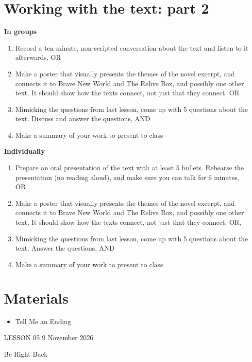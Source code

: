 \documentclass[11pt,a4paper,oneside]{book}
\newcommand{\tasktitle}[1]{{\color{blue}\bfseries #1}\par\smallskip}
\begin{document}
\section*{Working with the text: part 2}
\begin{taskbox}
\tasktitle{In groups}
\begin{enumerate}
\item Record a ten minute, non-scripted conversation about the text and listen to it afterwards, OR
\item Make a poster that visually presents the themes of the novel excerpt, and connects it to Brave New World and The Relive Box, and possibly one other text. It should show how the texts connect, not just that they connect, OR
\item Mimicking the questions from last lesson, come up with 5 questions about the text. Discuss and answer the questions, AND
\item Make a summary of your work to present to class
\end{enumerate}
\end{taskbox}
\begin{taskbox}
\tasktitle{Individually}
\begin{enumerate}
\item Prepare an oral presentation of the text with at least 5 bullets. Rehearse the presentation (no reading aloud), and make sure you can talk for 6 minutes, OR
\item Make a poster that visually presents the themes of the novel excerpt, and connects it to Brave New World and The Relive Box, and possibly one other text. It should show how the texts connect, not just that they connect, OR,
\item Mimicking the questions from last lesson, come up with 5 questions about the text. Answer the questions, AND
\item Make a summary of your work to present to class
\end{enumerate}
\end{taskbox}

\section*{Materials}

\begin{itemize}
\item Tell Me an Ending
\end{itemize}

\clearpage{}
{\color{blue}\small LESSON 05 \hfill 9 November 2026\par}
\vspace{4mm}
{\displayfont\color{navy}\fontsize{30}{34}\selectfont Be Right Back\par}\vspace{4mm}
\end{document}
